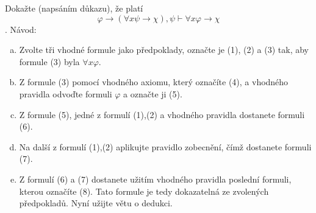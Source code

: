 Dokažte (napsáním důkazu), že platí
$$\varphi \rightarrow(\forall x \psi \rightarrow \chi),\psi\vdash \forall x
\varphi \rightarrow \chi$$.
Návod:
\begin{enumerate}[a)]
  \item Zvolte tři vhodné formule jako předpoklady, označte je (1), (2) a (3)
  tak, aby formule (3) byla $\forall x \varphi$.
  \item Z formule (3) pomocí vhodného axiomu, který označíte (4), a vhodného
  pravidla odvoďte formuli $\varphi$ a označte ji (5).
  \item Z formule (5), jedné z formulí (1),(2) a vhodného pravidla dostanete
  formuli (6).
  \item Na další z formulí (1),(2) aplikujte pravidlo zobecnění, čímž dostanete
  formuli (7).
  \item Z formulí (6) a (7) dostanete užitím vhodného pravidla poslední formuli,
  kterou označíte (8). Tato formule je tedy dokazatelná ze zvolených
  předpokladů. Nyní užijte větu o dedukci.
\end{enumerate}


